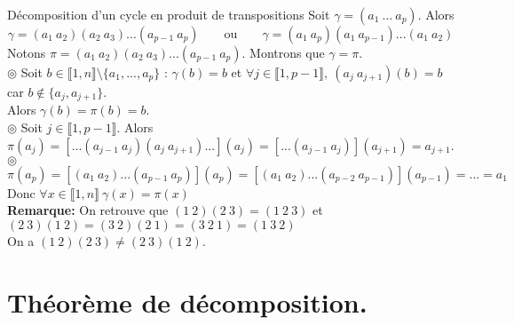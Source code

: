 \documentclass[11pt]{article}
\newcommand*{\lb}{\llbracket}
\newcommand*{\rb}{\rrbracket}
\newcommand*{\n}{\\[0.2cm]}
\newcommand{\0}{\varnothing}
\newcommand*{\g}{\gamma}
\begin{document}
\begin{prop}{Décomposition d'un cycle en produit de transpositions}{}
    Soit $\g=(a_1~...~a_p)$. Alors
    \begin{equation*}
        \g=(a_1~a_2)(a_2~a_3)...(a_{p-1}~a_p) \qquad \text{ou} \qquad \g=(a_1~a_p)(a_1~a_{p-1})...(a_1~a_2)
    \end{equation*}
    \tcblower
    Notons $\pi=(a_1~a_2)(a_2~a_3)...(a_{p-1}~a_p)$. Montrons que $\g=\pi$.\\
    $\circledcirc$ Soit $b\in\lb1,n\rb\setminus\{a_1,...,a_p\}$ : $\g(b)=b$ et $\forall j \in \lb1,p-1\rb, ~ (a_j~a_{j+1})(b)=b$ car $b\notin\{a_j,a_{j+1}\}$.\\
    Alors $\gamma(b)=\pi(b)=b$.\\
    $\circledcirc$ Soit $j\in\lb1,p-1\rb$. Alors $\pi(a_j)=\left[...(a_{j-1}~a_j)(a_j~a_{j+1})...\right](a_j)=\left[...(a_{j-1}~a_j)\right](a_{j+1})=a_{j+1}$.\\
    $\circledcirc$ $\pi(a_p)=[(a_1~a_2)...(a_{p-1}~a_p)](a_p)=[(a_1~a_2)...(a_{p-2}~a_{p-1})](a_{p-1})=...=a_1$\\
    Donc $\forall x \in \lb1,n\rb ~ \g(x)=\pi(x)$\n
    \textbf{Remarque:} On retrouve que $(1~2)(2~3)=(1~2~3)$ et $(2~3)(1~2) = (3~2)(2~1)=(3~2~1)=(1~3~2)$\\
    On a $(1~2)(2~3)\neq(2~3)(1~2)$.
\end{prop}

\section{Théorème de décomposition.}
\end{document}
